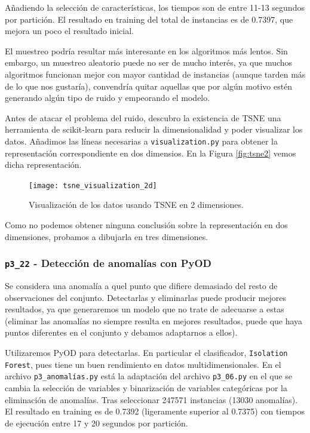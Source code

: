 \documentclass[a4paper, 20pt]{article}
\begin{document}
Añadiendo la selección de características, los tiempos son de entre 11-13 segundos por partición. El resultado en training del total de instancias es de 0.7397, que mejora un poco el resultado inicial.

El muestreo podría resultar más interesante en los algoritmos más lentos. Sin embargo, un muestreo aleatorio puede no ser de mucho interés, ya que muchos algoritmos funcionan mejor con mayor cantidad de instancias (aunque tarden más de lo que nos gustaría), convendría quitar aquellas que por algún motivo estén generando algún tipo de ruido y empeorando el modelo.

Antes de atacar el problema del ruido, descubro la existencia de TSNE una herramienta de scikit-learn para reducir la dimensionalidad y poder visualizar los datos. Añadimos las líneas necesarias a \texttt{visualization.py} para obtener la representación correspondiente en dos dimensios. En la Figura \ref{fig:tsne2} vemos dicha representación.

\begin{figure}[H]
    \centering
    \texttt{[image: tsne\_visualization\_2d]}
    \caption{Visualización de los datos usando TSNE en 2 dimensiones.}
    \label{fig:tsne2d}
\end{figure}

Como no podemos obtener ninguna conclusión sobre la representación en dos dimensiones, probamos a dibujarla en tres dimensiones.

\subsubsection{\texttt{p3\_22} - Detección de anomalías con PyOD}

Se considera una anomalía a quel punto que difiere demasiado del resto de observaciones del conjunto. Detectarlas y eliminarlas puede producir mejores resultados, ya que generaremos un modelo que no trate de adecuarse a estas (eliminar las anomalías no siempre resulta en mejores resultados, puede que haya puntos diferentes en el conjunto y debamos adaptarnos a ellos).

Utilizaremos PyOD para detectarlas. En particular el clasificador, \texttt{Isolation Forest}, pues tiene un buen rendimiento en datos multidimensionales. En el archivo \texttt{p3\_anomalías.py} está la adaptación del archivo \texttt{p3\_06.py} en el que se cambia la selección de variables y binarización de variables categóricas por la eliminación de anomalías. Tras seleccionar 247571 instancias (13030 anomalías). El resultado en training es de 0.7392 (ligeramente superior al 0.7375) con tiempos de ejecución entre 17 y 20 segundos por partición.
\end{document}
